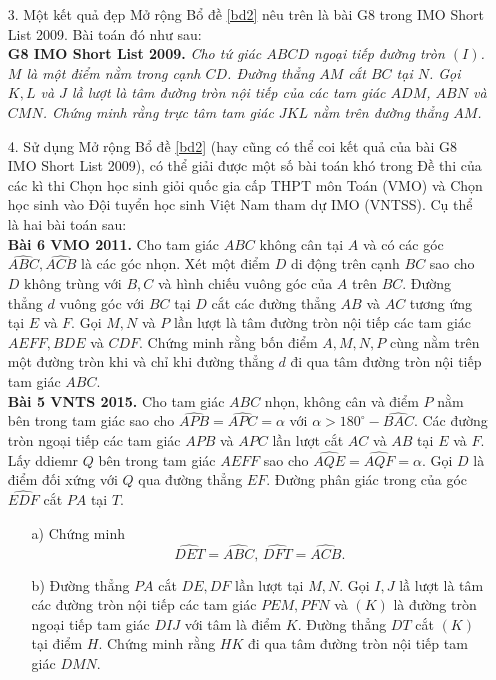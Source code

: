 \begin{bt}
{\begin{itemize}
			\item[3.] Một kết quả đẹp Mở rộng Bổ đề \ref{bd2} nêu trên là bài G8 trong IMO Short List 2009. Bài toán đó như sau:\\
			\textbf{G8 IMO Short List 2009.} \textit{Cho tứ giác $ABCD$ ngoại tiếp đường tròn $(I)$. $M$ là một điểm nằm trong cạnh $CD$. Đường thẳng $AM$ cắt $BC$ tại $N$. Gọi $K, L$ và $J$ lầ lượt là tâm đường tròn nội tiếp của các tam giác $ADM$, $ABN$ và $CMN$. Chứng minh rằng trực tâm tam giác $JKL$ nằm trên đường thẳng $AM$.}
			\item[4.] Sử dụng Mở rộng Bổ đề \ref{bd2} (hay cũng có thể coi kết quả của bài G8 IMO Short List 2009), có thể giải được một số bài toán khó trong Đề thi của các kì thi Chọn học sinh giỏi quốc gia cấp THPT môn Toán (VMO) và Chọn học sinh vào Đội tuyển học sinh Việt Nam tham dự IMO (VNTSS). Cụ thể là hai bài toán sau:\\
			\textbf{Bài 6 VMO 2011.} Cho tam giác $ABC$ không cân tại $A$ và có các góc $\widehat{ABC}, \widehat{ACB}$ là các góc nhọn. Xét một điểm $D$ di động trên cạnh $BC$ sao cho $D$ không trùng với $B, C$ và hình chiếu vuông góc của $A$ trên $BC$. Đường thẳng $d$ vuông góc với $BC$ tại $D$ cắt các đường thẳng $AB$ và $AC$ tương ứng tại $E$ và $F$. Gọi $M, N$ và $P$ lần lượt là tâm đường tròn nội tiếp các tam giác $AEFF, BDE$ và $CDF$. Chứng minh rằng bốn điểm $A, M, N, P$ cùng nằm trên một đường tròn khi và chỉ khi đường thẳng $d$ đi qua tâm đường tròn nội tiếp tam giác $ABC$.\\
			\textbf{Bài 5 VNTS 2015.} Cho tam giác $ABC$ nhọn, không cân và điểm $P$ nằm bên trong tam giác sao cho $\widehat{APB}=\widehat{APC}=\alpha$ với $\alpha>180^\circ-\widehat{BAC}$. Các đường tròn ngoại tiếp các tam giác $APB$ và $APC$ lần lượt cắt $AC$ và $AB$ tại $E$ và $F$. Lấy ddiemr $Q$ bên trong tam giác $AEFF$ sao cho $\widehat{AQE}=\widehat{AQF}=\alpha$. Gọi $D$ là điểm đối xứng với $Q$ qua đường thẳng $EF$. Đường phân giác trong của góc $\widehat{EDF}$ cắt $PA$ tại $T$.
			\begin{itemize}
				\item[a)] Chứng minh $$\widehat{DET}=\widehat{ABC},\,\widehat{DFT}=\widehat{ACB}.$$
				\item[b)] Đường thẳng $PA$ cắt $DE, DF$ lần lượt tại $M, N$. Gọi $I, J$ lầ lượt là tâm các đường tròn nội tiếp các tam giác $PEM, PFN$ và $(K)$ là đường tròn ngoại tiếp tam giác $DIJ$ với tâm là điểm $K$. Đường thẳng $DT$ cắt $(K)$ tại điểm $H$. Chứng minh rằng $HK$ đi qua tâm đường tròn nội tiếp tam giác $DMN$.
				\begin{flushright}

\end{flushright}
\end{itemize}
\end{itemize}}
\end{bt}
